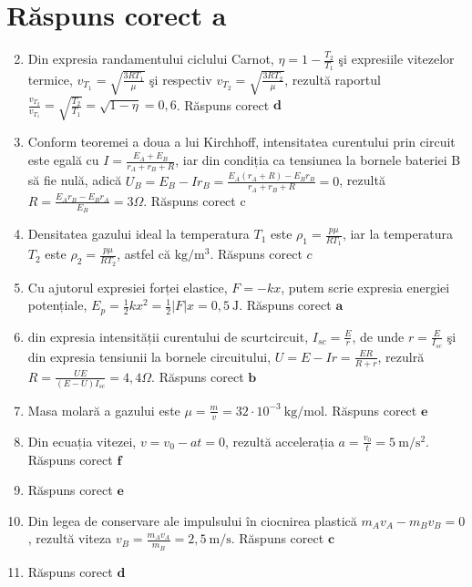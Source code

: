 \section*{Răspuns corect $\boldsymbol{a}$}
\begin{enumerate}
  \setcounter{enumi}{1}
  \item Din expresia randamentului ciclului Carnot, $\eta=1-\frac{T_{2}}{T_{1}}$ şi expresiile vitezelor termice, $v_{T_{1}}=\sqrt{\frac{3 R T_{1}}{\mu}}$ şi respectiv $v_{T_{2}}=\sqrt{\frac{3 R T_{2}}{\mu}}$, rezultă raportul $\frac{v_{T_{2}}}{v_{T_{1}}}=\sqrt{\frac{T_{2}}{T_{1}}}=\sqrt{1-\eta}=0,6$. Răspuns corect $\boldsymbol{d}$
  \item Conform teoremei a doua a lui Kirchhoff, intensitatea curentului prin circuit este egală cu $I=\frac{E_{A}+E_{B}}{r_{A}+r_{B}+R}$, iar din condiția ca tensiunea la bornele bateriei B să fie nulă, adică $U_{B}=E_{B}-I r_{B}=\frac{E_{A}\left(r_{A}+R\right)-E_{B} r_{B}}{r_{A}+r_{B}+R}=0$, rezultă $R=\frac{E_{A} r_{B}-E_{B} r_{A}}{E_{B}}=3 \Omega$. Răspuns corect c
  \item Densitatea gazului ideal la temperatura $T_{1}$ este $\rho_{1}=\frac{p \mu}{R T_{1}}$, iar la temperatura $T_{2}$ este $\rho_{2}=\frac{p \mu}{R T_{2}}$, astfel că $\mathrm{kg} / \mathrm{m}^{3}$. Răspuns corect $c$
  \item Cu ajutorul expresiei forței elastice, $F=-k x$, putem scrie expresia energiei potențiale, $E_{p}=\frac{1}{2} k x^{2}=\frac{1}{2}|F| x=0,5 \mathrm{~J}$. Răspuns corect $\boldsymbol{a}$
  \item din expresia intensității curentului de scurtcircuit, $I_{s c}=\frac{E}{r}$, de unde $r=\frac{E}{I_{s c}}$ şi din expresia tensiunii la bornele circuitului, $U=E-I r=\frac{E R}{R+r}$, rezulră $R=\frac{U E}{(E-U) I_{s c}}=4,4 \Omega$. Răspuns corect $\boldsymbol{b}$
  \item Masa molară a gazului este $\mu=\frac{m}{v}=32 \cdot 10^{-3} \mathrm{~kg} / \mathrm{mol}$. Răspuns corect $\boldsymbol{e}$
  \item Din ecuația vitezei, $v=v_{0}-a t=0$, rezultă accelerația $a=\frac{v_{0}}{t}=5 \mathrm{~m} / \mathrm{s}^{2}$. Răspuns corect $\boldsymbol{f}$
  \item Răspuns corect $\boldsymbol{e}$
  \item Din legea de conservare ale impulsului în ciocnirea plastică $m_{A} v_{A}-m_{B} v_{B}=0$, rezultă viteza $v_{B}=\frac{m_{A} v_{A}}{m_{B}}=2,5 \mathrm{~m} / \mathrm{s}$. Răspuns corect $\boldsymbol{c}$
  \item Răspuns corect $\boldsymbol{d}$

\end{enumerate}
